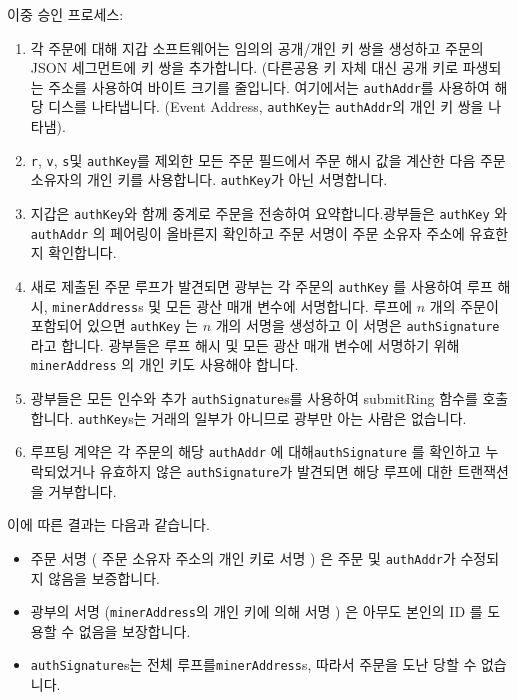 \documentclass{article}
\begin{document}
\begin{multicols}{2}
\indent 이중 승인 프로세스:


\begin{enumerate}

      \item 각 주문에 대해 지갑 소프트웨어는 임의의 공개/개인 키 쌍을 생성하고 주문의 JSON 세그먼트에 키 쌍을 추가합니다. (다른공용 키 자체 대신 공개 키로 파생되는 주소를 사용하여 바이트 크기를 줄입니다. 여기에서는 \verb|authAddr|를 사용하여 해당 디스를 나타냅니다. (Event Address, \verb|authKey|는 \verb|authAddr|의 개인 키 쌍을 나타냄).
      \item \verb|r|, \verb|v|, \verb|s|및 \verb|authKey|를 제외한 모든 주문 필드에서 주문 해시 값을 계산한 다음 주문 소유자의 개인 키를 사용합니다. \verb|authKey|가 아닌 서명합니다.
      \item 지갑은 \verb|authKey|와 함께 중계로 주문을 전송하여 요약합니다.광부들은 \verb|authKey| 와 \verb|authAddr| 의 페어링이 올바른지 확인하고 주문 서명이 주문 소유자 주소에 유효한지 확인합니다.
      \item 새로 제출된 주문 루프가 발견되면 광부는 각 주문의 \verb|authKey| 를 사용하여 루프 해시, \verb|minerAddress|s 및 모든 광산 매개 변수에 서명합니다. 루프에 $n$ 개의 주문이 포함되어 있으면 \verb|authKey| 는 $n$ 개의 서명을 생성하고 이 서명은 \verb|authSignature| 라고 합니다. 광부들은 루프 해시 및 모든 광산 매개 변수에 서명하기 위해 \verb|minerAddress| 의 개인 키도 사용해야 합니다.
      \item 광부들은 모든 인수와 추가 \verb|authSignature|s를 사용하여 submitRing 함수를 호출합니다. \verb|authKey|s는 거래의 일부가 아니므로 광부만 아는 사람은 없습니다.
      \item 루프팅 계약은 각 주문의 해당 \verb|authAddr| 에 대해\verb|authSignature| 를 확인하고 누락되었거나 유효하지 않은 \verb|authSignature|가 발견되면 해당 루프에 대한 트랜잭션을 거부합니다.
\end{enumerate}

\indent 이에 따른 결과는 다음과 같습니다.

\begin{itemize}

      \item  주문 서명 ( 주문 소유자 주소의 개인 키로 서명 ) 은 주문 및 \verb|authAddr|가 수정되지 않음을 보증합니다. 
      \item  광부의 서명 (\verb|minerAddress|의 개인 키에 의해 서명 ) 은 아무도 본인의 ID 를 도용할 수 없음을 보장합니다.
      \item \verb|authSignature|s는 전체 루프를\verb|minerAddress|s, 따라서 주문을 도난 당할 수 없습니다.


\end{itemize}
\end{multicols}
\end{document}
